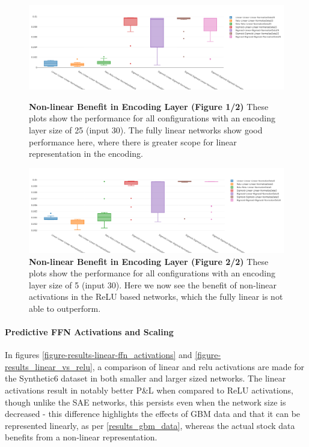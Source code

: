 \documentclass[a4paper,latin]{paper}
\begin{document}
\begin{figure}[H]
	\centering
	\begin{minipage}{0.45\textwidth}
	\centering \includegraphics[scale=0.2]{images/iteration_two/linear/3Encoding_25_Activation_Combos_Min_MSE.png}
	\caption{\textbf{Non-linear Benefit in Encoding Layer (Figure 1/2)}
		\newline These plots show the performance for all configurations with an encoding layer size of 25 (input 30). The fully linear networks show good performance here, where there is greater scope for linear representation in the encoding.}
	\label{figure-results-encoding25}
	\end{minipage}\hfill
	\begin{minipage}{0.45\textwidth}
	\centering \includegraphics[scale=0.2]{images/iteration_two/linear/4Encoding_5_Activation_Combos_Min_MSE.png}
	\caption{\textbf{Non-linear Benefit in Encoding Layer (Figure 2/2)}
		\newline These plots show the performance for all configurations with an encoding layer size of 5 (input 30). Here we now see the benefit of non-linear activations in the ReLU based networks, which the fully linear is not able to outperform.}
	\label{figure-results-encoding5}
	\end{minipage}
\end{figure}

\paragraph{Predictive FFN Activations and Scaling}

In figures \ref{figure-results-linear-ffn_activations} and \ref{figure-results_linear_vs_relu}, a comparison of linear and relu activations are made for the Synthetic6 dataset in both smaller and larger sized networks. The linear activations result in notably better P\&L when compared to ReLU activations, though unlike the SAE networks, this persists even when the network size is decreased - this difference highlights the effects of GBM data and that it can be represented linearly, as per \ref{results_gbm_data}, whereas the actual stock data benefits from a non-linear representation.\newline
\end{document}
